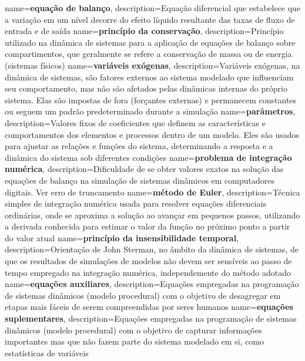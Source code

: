 {
    name=\textbf{equação de balanço},
    description={Equação diferencial que estabelece que a variação em um nível decorre do efeito líquido resultante das taxas de fluxo de entrada e de saída}
}
{
    name=\textbf{princípio da conservação},
    description={Princípio utilizado na dinâmica de sistemas para a aplicação de equações de balanço sobre compartimentos, que geralmente se refere a conservação de massa ou de energia (sistemas físicos)}
}
{
    name=\textbf{variáveis exógenas},
    description={Variáveis exógenas, na dinâmica de sistemas, são fatores externos ao sistema modelado que influenciam seu comportamento, mas não são afetados pelas dinâmicas internas do próprio sistema. Elas são impostas de fora (forçantes externas) e permanecem constantes ou seguem um padrão predeterminado durante a simulação}
}
{
    name=\textbf{parâmetros},
    description={Valores fixos de coeficientes que definem as características e comportamentos dos elementos e processos dentro de um modelo. Eles são usados para ajustar as relações e funções do sistema, determinando a resposta e a dinâmica do sistema sob diferentes condições}
}
{
    name=\textbf{problema de integração numérica},
    description={Dificuldade de se obter valores exatos na solução das equações de balanço na simulação de sistemas dinâmicos em computadores digitais. Ver erro de truncamento}
}
{
    name=\textbf{método de Euler},
    description={Técnica simples de integração numérica usada para resolver equações diferenciais ordinárias, onde se aproxima a solução ao avançar em pequenos passos, utilizando a derivada conhecida para estimar o valor da função no próximo ponto a partir do valor atual}
}
{
    name=\textbf{princípio da insensibilidade temporal},
    description={Orientação de John Sterman, no âmbito da dinâmica de sistemas, de que os resultados de simulações de modelos não devem ser sensíveis ao passo de tempo empregado na integração numérica, independemente do método adotado}
}
{
    name=\textbf{equações auxiliares},
    description={Equações empregadas na programação de sistemas dinâmicos (modelo procedural) com o objetivo de desagregar em etapas mais fáceis de serem compreendidas por seres humanos}
}
{
    name=\textbf{equações suplementares},
    description={Equações empregadas na programação de sistemas dinâmicos (modelo procedural) com o objetivo de capturar informações importantes mas que não fazem parte do sistema modelado em si, como estatísticas de variáveis}
}
